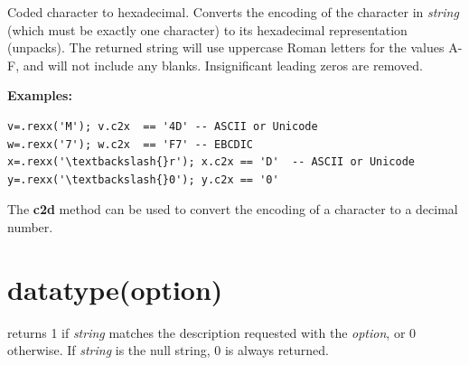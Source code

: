 Coded character to hexadecimal.
Converts the encoding of the character in \emph{string} (which must be
exactly one character) to its hexadecimal representation (unpacks).
The returned string will use uppercase Roman letters for the values A-F,
and will not include any blanks.
Insignificant leading zeros are removed.
 
\textbf{Examples:}
\begin{lstlisting}
v=.rexx('M'); v.c2x  == '4D' -- ASCII or Unicode
w=.rexx('7'); w.c2x  == 'F7' -- EBCDIC
x=.rexx('\textbackslash{}r'); x.c2x == 'D'  -- ASCII or Unicode
y=.rexx('\textbackslash{}0'); y.c2x == '0'
\end{lstlisting}
 The  \textbf{c2d} method %
 can be used to
convert the encoding of a character to a decimal number.
\section{datatype(option)}\label{refdataty}
\index{,}
\index{,}
\index{,}

returns 1 if \emph{string} matches the description requested with
the \emph{option}, or 0 otherwise.
If \emph{string} is the null string, 0 is always returned.
 
